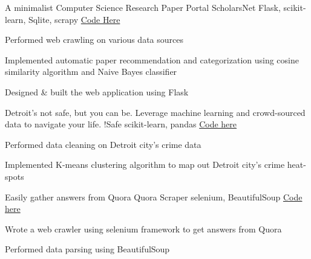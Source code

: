 

\begin{cventries}
  \cventry
    {A minimalist Computer Science Research Paper Portal} %
    {ScholarsNet} %
    {Flask, scikit-learn, Sqlite, scrapy} %
    {\href{https://github.com/budiryan/ScholarsNet}{Code Here}} %
    {
      \begin{cvitems} %
      \item  {Performed web crawling on various data sources}
      \item {Implemented automatic paper recommendation and categorization using cosine similarity algorithm and Naive Bayes classifier}
      \item {Designed \& built the web application using Flask}
      \end{cvitems}
    }

  \cventry
    {Detroit's not safe, but you can be. Leverage machine learning and crowd-sourced data to navigate your life.} %
    {!Safe} %
    {scikit-learn, pandas} %
    {\href{https://github.com/alioben/GoDetroit}{Code here} } %
    {
      \begin{cvitems} %
        \item {Performed data cleaning on Detroit city's crime data}
        \item {Implemented K-means clustering algorithm to map out Detroit city's crime heat-spots}
      \end{cvitems}
    }

  \cventry
    {Easily gather answers from Quora} %
    {Quora Scraper} %
    {selenium, BeautifulSoup} %
    {\href{https://github.com/budiryan/quora-scraper}{Code here}} %
    {
      \begin{cvitems} %
        \item {Wrote a web crawler using selenium framework to get answers from Quora}
        \item {Performed data parsing using BeautifulSoup}
      \end{cvitems}
    }


\end{cventries}

